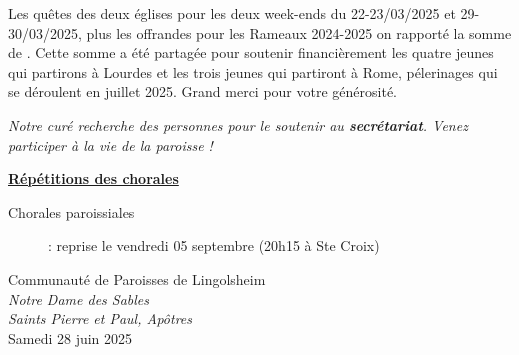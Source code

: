 \documentclass[french,11pt]{article}
\newcommand{\JournalName}[1]{%
		\begin{center}
            \Large \usefont{T1}{augie}{m}{n}
			#1%
		\end{center}
		\par \normalsize \normalfont}
\newcommand*{\footer}{..}
\newcommand{\NewsItem}[1]{%
\vspace{3pt}
\underline{\textbf{#1}}
		  }
\begin{document}
\begin{framed}
Les quêtes des deux églises pour les deux week-ends du 22-23/03/2025 et 29-30/03/2025, plus les offrandes pour les Rameaux 2024-2025 on rapporté
la somme de . Cette somme a été partagée pour soutenir financièrement les quatre jeunes qui partirons à Lourdes et les trois jeunes qui partiront à Rome,
pélerinages qui se déroulent en juillet 2025. Grand merci pour votre générosité.
\end{framed}

\emph{Notre curé recherche des personnes pour le soutenir au \textbf{secrétariat}. Venez participer à la vie de la paroisse !}

\NewsItem{Répétitions des chorales}
\begin{description}
\item[Chorales paroissiales] : reprise le vendredi 05 septembre (20h15 à Ste Croix)
\end{description}



\newpage

\JournalName{Communauté de Paroisses de Lingolsheim \\
\normalsize \textit{Notre Dame des Sables}
\\  \normalsize \textit{Saints Pierre et Paul, Apôtres}
\\ \large Samedi 28 juin  2025}


\begin{minipage}[h]{1.0\linewidth}
\setlength{\parindent}{1em}

\end{minipage}
\end{document}
